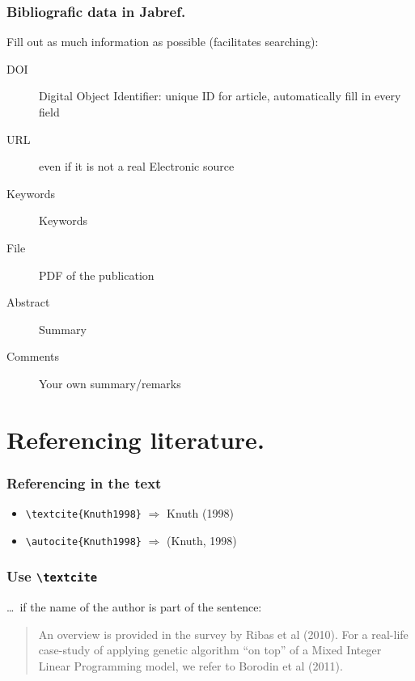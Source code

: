 \documentclass[aspectratio=169]{beamer}
\begin{document}
\begin{frame}
  \frametitle{Bibliografic data in Jabref.}

  Fill out as much information as possible (facilitates searching):

  \begin{description}
    \item[DOI] Digital Object Identifier: unique ID for article, automatically fill in every field
    \item[URL] even if it is not a real Electronic source
    \item[Keywords] Keywords
    \item[File] PDF of the publication
    \item[Abstract] Summary
    \item[Comments] Your own summary/remarks
  \end{description}

\end{frame}

\section{Referencing literature.}

\begin{frame}[fragile]
    \frametitle{Referencing in the text}
    
    \begin{itemize}
      \item \verb|\textcite{Knuth1998}| \(\Rightarrow\) Knuth (1998)
      \item \verb|\autocite{Knuth1998}| \(\Rightarrow\) (Knuth, 1998)
    \end{itemize}
\end{frame}

\begin{frame}
\frametitle{Use \texttt{\textbackslash{}textcite}}

\ldots\ if the name of the author is part of the sentence:

\bigskip

\begin{quotation}
    An overview is provided in the survey by Ribas et al (2010). For a real-life case-study of applying genetic algorithm ``on top'' of a Mixed Integer Linear Programming model, we refer to Borodin et al (2011).
\end{quotation}

\end{frame}
\end{document}
